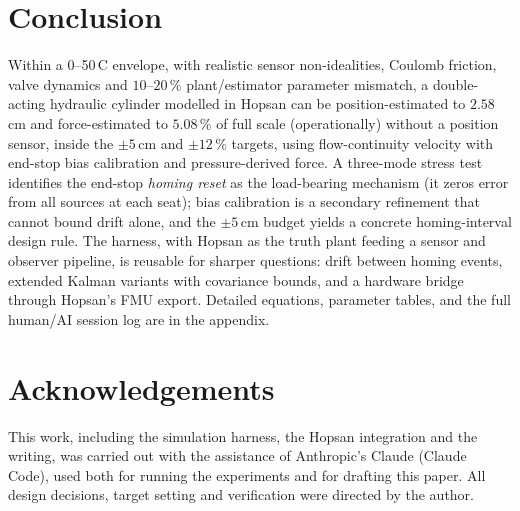 \documentclass[conference]{IEEEtran}
\begin{document}
\section{Conclusion}
Within a 0--50\,\textdegree C envelope, with realistic sensor non-idealities,
Coulomb friction, valve dynamics and $10$--$20\,\%$ plant/estimator parameter
mismatch, a double-acting hydraulic cylinder modelled in Hopsan can be
position-estimated to $2.58$\,cm and force-estimated to $5.08\,\%$ of full scale
(operationally) without a position sensor, inside the $\pm 5$\,cm and $\pm 12\,\%$
targets, using flow-continuity velocity with end-stop bias calibration and
pressure-derived force. A three-mode stress test identifies the end-stop
\emph{homing reset} as the load-bearing mechanism (it zeros error from all
sources at each seat); bias calibration is a secondary refinement that cannot
bound drift alone, and the $\pm 5$\,cm budget yields a concrete homing-interval
design rule. The
harness, with Hopsan as the truth plant feeding a sensor and observer pipeline,
is reusable for sharper questions: drift between homing events, extended Kalman
variants with covariance bounds, and a hardware bridge through Hopsan's FMU
export. Detailed equations, parameter tables, and the full human/AI session log
are in the appendix.

\section*{Acknowledgements}
This work, including the simulation harness, the Hopsan integration and the
writing, was carried out with the assistance of Anthropic's Claude (Claude Code),
used both for running the experiments and for drafting this paper. All design
decisions, target setting and verification were directed by the author.




\appendices

\end{document}
